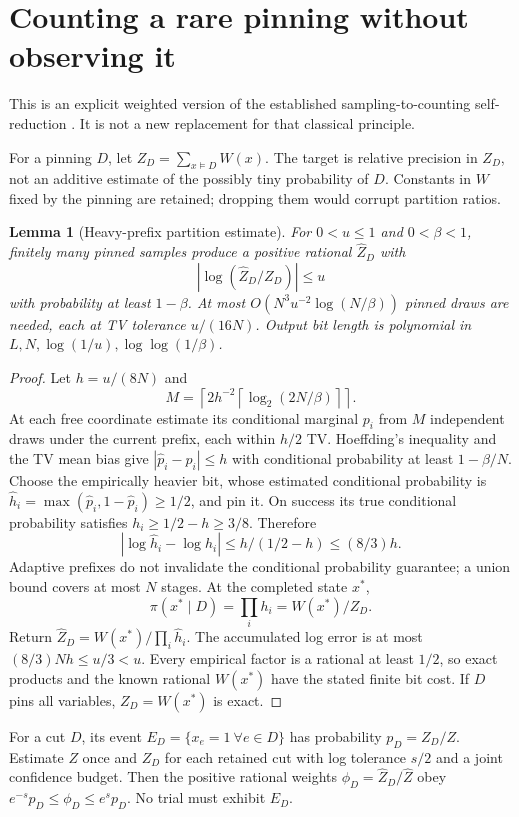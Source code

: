 \documentclass[11pt]{article}
\newtheorem{lemma}[theorem]{Lemma}
\newcommand{\ceil}[1]{\left\lceil #1\right\rceil}
\begin{document}
\section{Counting a rare pinning without observing it}
\label{sec:prefix}
This is an explicit weighted version of the established sampling-to-counting self-reduction \cite{jvv}. It is not a new replacement for that classical principle.

For a pinning $D$, let $Z_D=\sum_{x\models D}W(x)$. The target is relative precision in $Z_D$, not an additive estimate of the possibly tiny probability of $D$. Constants in $W$ fixed by the pinning are retained; dropping them would corrupt partition ratios.

\begin{lemma}[Heavy-prefix partition estimate]
For $0<u\le1$ and $0<\beta<1$, finitely many pinned samples produce a positive rational $\widehat Z_D$ with
\[
 |\log(\widehat Z_D/Z_D)|\le u
\]
with probability at least $1-\beta$. At most $O(N^3u^{-2}\log(N/\beta))$ pinned draws are needed, each at TV tolerance $u/(16N)$. Output bit length is polynomial in $L,N,\log(1/u),\log\log(1/\beta)$.
\end{lemma}
\begin{proof}
Let $h=u/(8N)$ and
\[
 M=\ceil{2h^{-2}\ceil{\log_2(2N/\beta)}}.
\]
At each free coordinate estimate its conditional marginal $p_i$ from $M$ independent draws under the current prefix, each within $h/2$ TV. Hoeffding's inequality and the TV mean bias give $|\widehat p_i-p_i|\le h$ with conditional probability at least $1-\beta/N$. Choose the empirically heavier bit, whose estimated conditional probability is $\widehat h_i=\max(\widehat p_i,1-\widehat p_i)\ge1/2$, and pin it. On success its true conditional probability satisfies $h_i\ge1/2-h\ge3/8$. Therefore
\[
 |\log\widehat h_i-\log h_i|\le h/(1/2-h)\le(8/3)h.
\]
Adaptive prefixes do not invalidate the conditional probability guarantee; a union bound covers at most $N$ stages. At the completed state $x^*$,
\[
 \pi(x^*\mid D)=\prod_i h_i=W(x^*)/Z_D.
\]
Return $\widehat Z_D=W(x^*)/\prod_i\widehat h_i$. The accumulated log error is at most $(8/3)Nh\le u/3<u$. Every empirical factor is a rational at least $1/2$, so exact products and the known rational $W(x^*)$ have the stated finite bit cost. If $D$ pins all variables, $Z_D=W(x^*)$ is exact.
\end{proof}

For a cut $D$, its event $E_D=\{x_e=1\ \forall e\in D\}$ has probability $p_D=Z_D/Z$. Estimate $Z$ once and $Z_D$ for each retained cut with log tolerance $s/2$ and a joint confidence budget. Then the positive rational weights $\phi_D=\widehat Z_D/\widehat Z$ obey $e^{-s}p_D\le\phi_D\le e^sp_D$. No trial must exhibit $E_D$.
\end{document}

